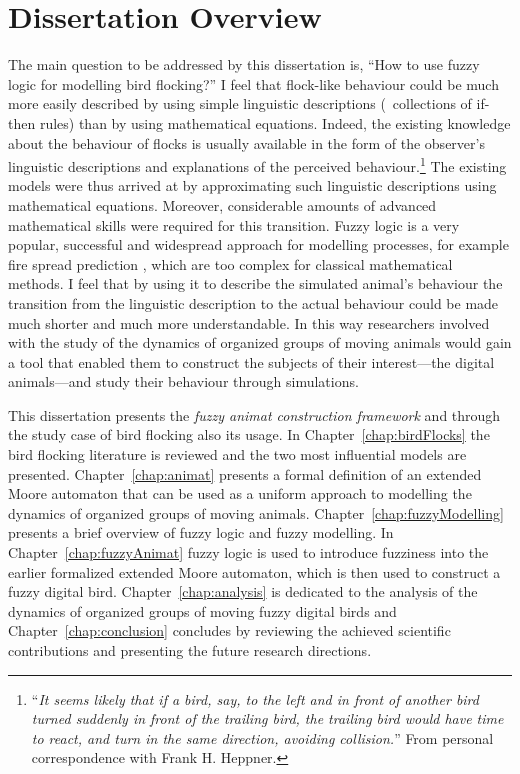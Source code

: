 \section{Dissertation Overview}
The main question to be addressed by this dissertation is, ``How to use fuzzy logic for modelling bird flocking?'' I feel that flock-like behaviour could be much more easily described by using simple linguistic descriptions (\eg\ collections of if-then rules) than by using mathematical equations. Indeed, the existing knowledge about the behaviour of flocks is usually available in the form of the observer's linguistic descriptions and explanations of the perceived behaviour.\footnote{``\emph{It seems likely that if a bird, say, to the left and in front of another bird turned suddenly in front of the trailing bird, the trailing bird would have time to react, and turn in the same direction, avoiding collision.}'' From personal correspondence with Frank H. Heppner.} The existing models were thus arrived at by approximating such linguistic descriptions using mathematical equations. Moreover, considerable amounts of advanced mathematical skills were required for this transition. Fuzzy logic \cite{zadeh:1965} is a very popular, successful and widespread approach for modelling processes, for example fire spread prediction \cite{mraz:1999,vakalis:2004a,vakalis:2004b}, which are too complex for classical mathematical methods. I feel that by using it to describe the simulated animal's behaviour the transition from the linguistic description to the actual behaviour could be made much shorter and much more understandable. In this way researchers involved with the study of the dynamics of organized groups of moving animals would gain a tool that enabled them to construct the subjects of their interest---the digital animals---and study their behaviour through simulations.

This dissertation presents the \emph{fuzzy animat construction framework} and through the study case of bird flocking also its usage. In Chapter~\ref{chap:birdFlocks} the bird flocking literature is reviewed and the two most influential models are presented. Chapter~\ref{chap:animat} presents a formal definition of an extended Moore automaton that can be used as a uniform approach to modelling the dynamics of organized groups of moving animals. Chapter~\ref{chap:fuzzyModelling} presents a brief overview of fuzzy logic and fuzzy modelling. In Chapter~\ref{chap:fuzzyAnimat} fuzzy logic is used to introduce fuzziness into the earlier formalized extended Moore automaton, which is then used to construct a fuzzy digital bird. Chapter~\ref{chap:analysis} is dedicated to the analysis of the dynamics of organized groups of moving fuzzy digital birds and Chapter~\ref{chap:conclusion} concludes by reviewing the achieved scientific contributions and presenting the future research directions.

